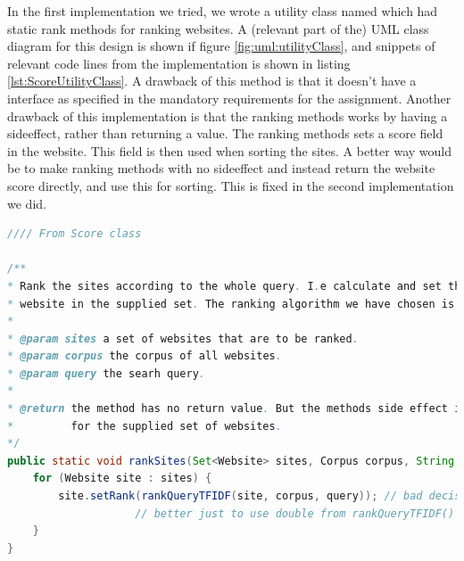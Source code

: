 In the first implementation we tried, we wrote a utility class named  which had static rank methods for ranking websites.   
A (relevant part of the) UML class diagram for this design is shown if figure \ref{fig:uml:utilityClass}, and snippets of relevant code lines from the implementation is shown in listing \ref{lst:ScoreUtilityClass}. 
A drawback of this method is that it doesn't have a  interface as specified in the mandatory requirements for the assignment.
Another drawback of this implementation is that the ranking methods works by having a sideeffect, rather than returning a value. The ranking methods sets a score field in the website. This field is then used when sorting the sites. A better way would be to make ranking methods with no sideeffect and instead return the website score directly, and use this for sorting. This is fixed in the second implementation we did.      

\begin{lstlisting}[language=Java, caption=This is a code example., label=lst:ScoreUtilityClass]
//// From Score class 

/**
* Rank the sites according to the whole query. I.e calculate and set the rank field of each
* website in the supplied set. The ranking algorithm we have chosen is TFIDF.
* 
* @param sites a set of websites that are to be ranked.
* @param corpus the corpus of all websites.
* @param query the searh query.
* 
* @return the method has no return value. But the methods side effect is to set the rank field
*         for the supplied set of websites.
*/
public static void rankSites(Set<Website> sites, Corpus corpus, String query) {
	for (Website site : sites) {
		site.setRank(rankQueryTFIDF(site, corpus, query)); // bad decision! 
					// better just to use double from rankQueryTFIDF() and do the sorting imidiately. 
	}
}
\end{lstlisting}

